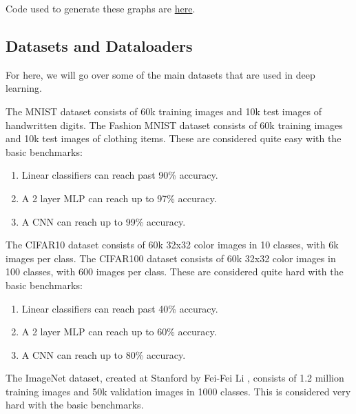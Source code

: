     \begin{code} 
      Code used to generate these graphs are \href{code/01_MLP/activation_functions.ipynb}{here}.
    \end{code} 

  \subsection{Datasets and Dataloaders} 

    For here, we will go over some of the main datasets that are used in deep learning. 

    \begin{definition}
      The MNIST dataset consists of 60k training images and 10k test images of handwritten digits. The Fashion MNIST dataset consists of 60k training images and 10k test images of clothing items. These are considered quite easy with the basic benchmarks: 
      \begin{enumerate} 
        \item Linear classifiers can reach past 90\% accuracy. 
        \item A 2 layer MLP can reach up to 97\% accuracy. 
        \item A CNN can reach up to 99\% accuracy. 
      \end{enumerate}
    \end{definition}

    \begin{definition}
      The CIFAR10 dataset consists of 60k 32x32 color images in 10 classes, with 6k images per class. The CIFAR100 dataset consists of 60k 32x32 color images in 100 classes, with 600 images per class. These are considered quite hard with the basic benchmarks: 
      \begin{enumerate} 
        \item Linear classifiers can reach past 40\% accuracy. 
        \item A 2 layer MLP can reach up to 60\% accuracy. 
        \item A CNN can reach up to 80\% accuracy. 
      \end{enumerate}
    \end{definition}

    \begin{definition}[ImageNet]
      The ImageNet dataset, created at Stanford by Fei-Fei Li \cite{ImageNet}, consists of 1.2 million training images and 50k validation images in 1000 classes. This is considered very hard with the basic benchmarks. 
    \end{definition}

